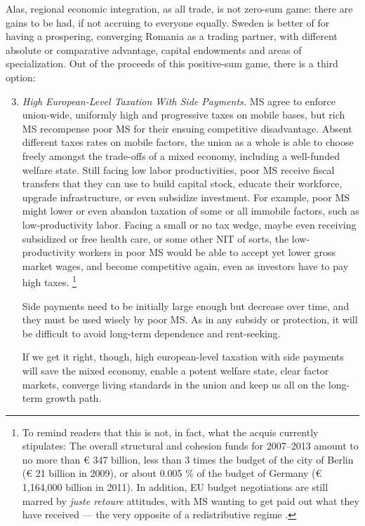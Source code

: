 Alas, regional economic integration, as all trade, is not zero-sum game:
there are gains to be had, if not accruing to everyone equally.
Sweden is better of for having a prospering, converging Romania as a trading partner, with different absolute or comparative advantage, capital endowments and areas of specialization.
Out of the proceeds of this positive-sum game, there is a third option:
\begin{enumerate}
	\setcounter{enumi}{2}
	\item \emph{High European-Level Taxation With Side Payments.} \gls{MS} agree to enforce union-wide, uniformly high and progressive taxes on mobile bases, but rich \gls{MS} recompense poor \gls{MS} for their ensuing competitive disadvantage.
Absent different taxes rates on mobile factors, the union as a whole is able to choose freely amongst the trade-offs of a mixed economy, including a well-funded welfare state.
Still facing low labor productivities, poor \gls{MS} receive fiscal transfers that they can use to build capital stock, educate their workforce, upgrade infrastructure, or even subsidize investment.
For example, poor \gls{MS} might lower or even abandon taxation of some or all immobile factors, such as low-productivity labor.
Facing a small or no tax wedge, maybe even receiving subsidized or free health care, or some other \gls{NIT} of sorts, the low-productivity workers in poor \gls{MS} would be able to accept yet lower gross market wages, and become competitive again, even as investors have to pay high taxes.
\footnote{
	To remind readers that this is not, in fact, what the acquis currently stipulates:
	The overall structural and cohesion funds for 2007--2013 amount to no more than \euro{} 347 billion, less than 3 times the budget of the city of Berlin (\euro{} 21 billion in 2009), or about 0.005 \% of the budget of Germany (\euro{} 1,164,000 billion in 2011).
	In addition, \gls{EU} budget negotiations are still marred by \emph{juste retoure} attitudes, with \gls{MS} wanting to get paid out what they have received --- the very opposite of a redistributive regime \cite[for example,][]{Begg2008a}.
}

	Side payments need to be initially large enough but decrease over time, and they must be used wisely by poor \gls{MS}.
As in any subsidy or  protection, it will be difficult to avoid long-term dependence and rent-seeking.

	If we get it right, though, high european-level taxation with side payments will save the mixed economy, enable a potent welfare state, clear factor markets, converge living standards in the union and keep us all on the long-term growth path.
\end{enumerate}

